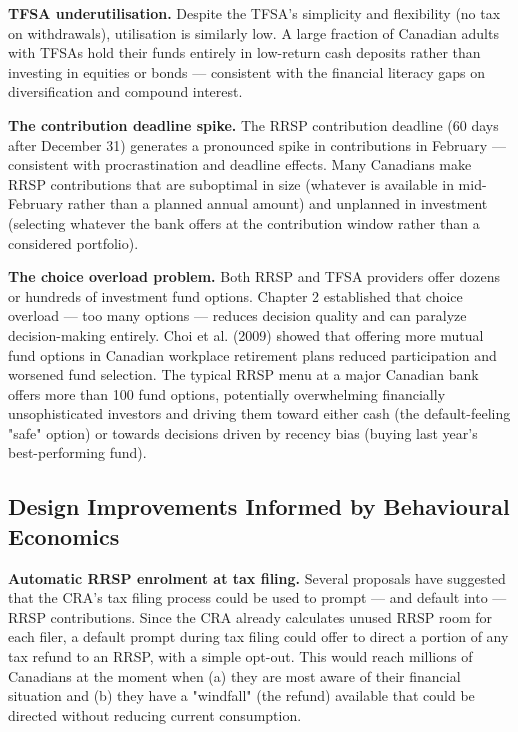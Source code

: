 \documentclass[12pt, letterpaper]{article}
\begin{document}
\textbf{TFSA underutilisation.} Despite the TFSA's simplicity and flexibility (no tax on withdrawals), utilisation is similarly low. A large fraction of Canadian adults with TFSAs hold their funds entirely in low-return cash deposits rather than investing in equities or bonds --- consistent with the financial literacy gaps on diversification and compound interest.

\textbf{The contribution deadline spike.} The RRSP contribution deadline (60 days after December 31) generates a pronounced spike in contributions in February --- consistent with procrastination and deadline effects. Many Canadians make RRSP contributions that are suboptimal in size (whatever is available in mid-February rather than a planned annual amount) and unplanned in investment (selecting whatever the bank offers at the contribution window rather than a considered portfolio).

\textbf{The choice overload problem.} Both RRSP and TFSA providers offer dozens or hundreds of investment fund options. Chapter 2 established that choice overload --- too many options --- reduces decision quality and can paralyze decision-making entirely. Choi et al. (2009) showed that offering more mutual fund options in Canadian workplace retirement plans reduced participation and worsened fund selection. The typical RRSP menu at a major Canadian bank offers more than 100 fund options, potentially overwhelming financially unsophisticated investors and driving them toward either cash (the default-feeling "safe" option) or towards decisions driven by recency bias (buying last year's best-performing fund).


\subsection{Design Improvements Informed by Behavioural Economics}


\textbf{Automatic RRSP enrolment at tax filing.} Several proposals have suggested that the CRA's tax filing process could be used to prompt --- and default into --- RRSP contributions. Since the CRA already calculates unused RRSP room for each filer, a default prompt during tax filing could offer to direct a portion of any tax refund to an RRSP, with a simple opt-out. This would reach millions of Canadians at the moment when (a) they are most aware of their financial situation and (b) they have a "windfall" (the refund) available that could be directed without reducing current consumption.
\end{document}
